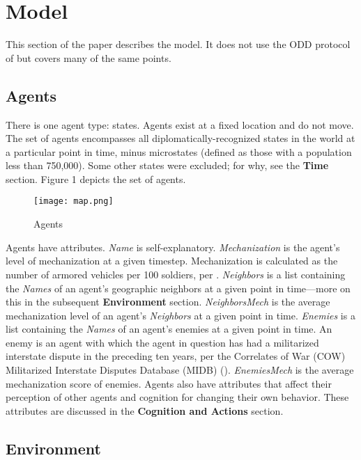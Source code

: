 \documentclass{article}
\begin{document}
\section{Model}

This section of the paper describes the model. It does not use the ODD protocol
of \cite{grimm2006standard} but covers many of the same points.

\subsection{Agents}

There is one agent type: states. Agents exist at a fixed location and do not
move. The set of agents encompasses all diplomatically-recognized 
states in the world at a particular point in time, minus microstates (defined as
those with a population less than 750,000). Some other states were excluded; for
why, see the \textbf{Time}
section. Figure 1 depicts the set of agents.

\begin{figure}[h!]
	\centering
	\caption{Agents}
\texttt{[image: map.png]}
\end{figure}

Agents have attributes. \textit{Name} is self-explanatory.
\textit{Mechanization} is the agent's level of mechanization at a given
timestep. Mechanization is calculated as the number of armored vehicles per 100
soldiers, per \cite{sechser2010army}. \textit{Neighbors} is a list containing
the \textit{Names} of an agent's geographic neighbors at a given point in
time---more on this in the subsequent \textbf{Environment} section. \textit{NeighborsMech} is the
average mechanization level of an agent's \textit{Neighbors} at a given point in
time. \textit{Enemies} is a list containing the \textit{Names} of an agent's
enemies at a given point in time. An enemy is an agent with which the agent in
question has had a militarized interstate dispute in the preceding ten years,
per the Correlates of War (COW) Militarized Interstate Disputes Database (MIDB)
(\cite{cow_midb}). \textit{EnemiesMech} is the average mechanization score of
enemies. Agents also have attributes that affect their
perception of other agents and cognition for changing their own behavior. These
attributes are discussed in the \textbf{Cognition and Actions} section.


\subsection{Environment}
\end{document}
